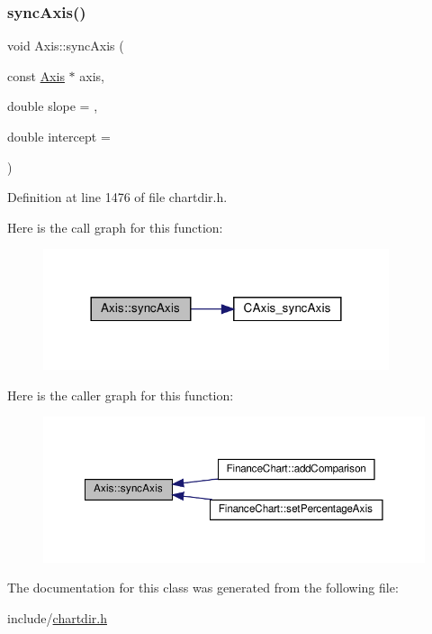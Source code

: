 \subsubsection{\texorpdfstring{sync\+Axis()}{syncAxis()}}
{\footnotesize\ttfamily void Axis\+::sync\+Axis (\begin{DoxyParamCaption}\item[{const \hyperlink{class_axis}{Axis} $\ast$}]{axis,  }\item[{double}]{slope = {},  }\item[{double}]{intercept = {} }\end{DoxyParamCaption})\hspace{0.3cm}{\ttfamily [inline]}}



Definition at line 1476 of file chartdir.\+h.

Here is the call graph for this function\+:
\nopagebreak
\begin{figure}[H]
\begin{center}
\leavevmode
\includegraphics[width=288pt]{class_axis_a27bf2d4b4c44ecf49e1ba7aad25bb897_cgraph}
\end{center}
\end{figure}
Here is the caller graph for this function\+:
\nopagebreak
\begin{figure}[H]
\begin{center}
\leavevmode
\includegraphics[width=350pt]{class_axis_a27bf2d4b4c44ecf49e1ba7aad25bb897_icgraph}
\end{center}
\end{figure}


The documentation for this class was generated from the following file\+:\begin{DoxyCompactItemize}
\item 
include/\hyperlink{chartdir_8h}{chartdir.\+h}\end{DoxyCompactItemize}
